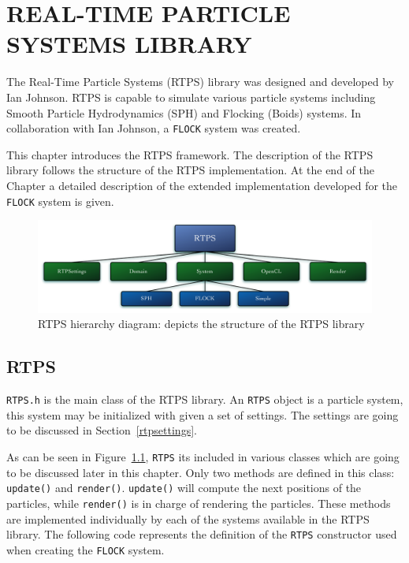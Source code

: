 \chapter{REAL-TIME PARTICLE SYSTEMS LIBRARY}\label{RTPSchapter}

The Real-Time Particle Systems (RTPS) library was designed and developed by Ian Johnson\cite{ianPaper}. RTPS is capable to simulate various particle systems including Smooth Particle Hydrodynamics (SPH) and Flocking (Boids) systems. In collaboration with Ian Johnson, a \texttt{FLOCK} system was created.

This chapter introduces the RTPS framework. The description of the RTPS library follows the structure of the RTPS implementation. At the end of the Chapter a detailed description of the extended implementation developed for the \texttt{FLOCK} system is given. 

\begin{figure}[htbp]
\begin{center}
\includegraphics[scale=0.30]{figures/RTPSdiagramMyrna.pdf}
\caption{RTPS hierarchy diagram: depicts the structure of the RTPS library}
\label{RTPSdiagram}
\end{center}
\end{figure}

\section{RTPS}\label{rtpssection}
\texttt{RTPS.h} is the main class of the RTPS library. An \texttt{RTPS} object is a particle system, this system may be initialized with given a set of settings. The settings are going to be discussed in Section~\ref{rtpsettings}. 

As can be seen in Figure~\ref{RTPSdiagram}, \texttt{RTPS} its included in various classes which are going to be discussed later in this chapter. Only two methods are defined in this class: \texttt{update()} and \texttt{render()}. \texttt{update()} will compute the next positions of the particles, while \texttt{render()} is in charge of rendering the particles. These methods are implemented individually by each of the systems available in the RTPS library. The following code represents the definition of the \texttt{RTPS} constructor used when creating the \texttt{FLOCK} system.

